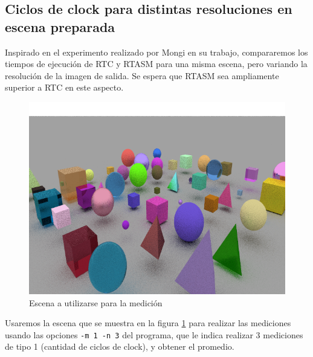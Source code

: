 \subsection{Ciclos de clock para distintas resoluciones en escena preparada}

Inspirado en el experimento realizado por Mongi en su trabajo, compararemos los
tiempos de ejecución de RTC y RTASM para una misma escena, pero variando la
resolución de la imagen de salida. Se espera que RTASM sea ampliamente superior
a RTC en este aspecto.

\begin{figure}[H]
  \centering
  \includegraphics[width=.8\textwidth]{./imgs/exp2-scene.png}
  \caption{Escena a utilizarse para la medición}
  \label{fig:exp2-scene}
\end{figure}

Usaremos la escena que se muestra en la figura \ref{fig:exp2-scene} para
realizar las mediciones usando las opciones \texttt{-m 1 -n 3} del programa, que
le indica realizar 3 mediciones de tipo 1 (cantidad de ciclos de clock), y
obtener el promedio.

